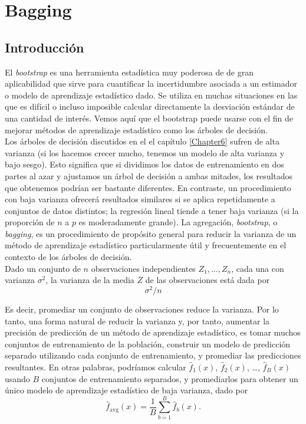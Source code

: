 \chapter{Bagging}\label{Chapter10} 

\section{Introducción}

El \textit{bootstrap} es una herramienta estadística muy poderosa de de gran aplicabilidad que sirve para cuantificar la incertidumbre asociada a un estimador o modelo de aprendizaje estadístico dado. Se utiliza en muchas situaciones en las que es difícil o incluso imposible calcular directamente la desviación estándar de una cantidad de interés. Vemos aquí que el bootstrap puede usarse con el fin de mejorar métodos de aprendizaje estadístico como los árboles de decisión. \\

Los árboles de decisión discutidos en el el capítulo \ref{Chapter6} sufren de alta varianza (si los hacemos crecer mucho, tenemos un modelo de alta varianza y bajo sesgo). Esto significa que si dividimos los datos de entrenamiento en dos partes al azar y ajustamos un árbol de decisión a ambas mitades, los resultados que obtenemos podrían ser bastante diferentes. En contraste, un procedimiento con baja varianza ofrecerá resultados similares si se aplica repetidamente a conjuntos de datos distintos; la regresión lineal tiende a tener baja varianza (si la proporción de $n$ a $p$ es moderadamente grande). La agregación, \textit{bootstrap}, o \textit{bagging}, es un procedimiento de propósito general para reducir la varianza de un método de aprendizaje estadístico particularmente útil y frecuentemente en el contexto de los árboles de decisión. \\

Dado un conjunto de $n$ observaciones independientes $Z_1, \ldots, Z_n$, cada una con varianza $\sigma^2$, la varianza de la media $\overline{Z}$ de las observaciones está dada por 
\begin{equation}
\sigma^2/n
\end{equation}

Es decir, promediar un conjunto de observaciones reduce la varianza. Por lo tanto, una forma natural de reducir la varianza y, por tanto, aumentar la precisión de predicción de un método de aprendizaje estadístico, es tomar muchos conjuntos de entrenamiento de la población, construir un modelo de predicción separado utilizando cada conjunto de entrenamiento, y promediar las predicciones resultantes. En otras palabras, podríamos calcular $\hat{f}_1(x)$, $\hat{f}_2(x)$, \ldots, $\hat{f}_B(x)$ usando $B$ conjuntos de entrenamiento separados, y promediarlos para obtener un único modelo de aprendizaje estadístico de baja varianza, dado por
\begin{equation}
\hat{f}_{\text{avg}}(x) = \frac{1}{B} \sum_{b=1}^{B} \hat{f}_b(x).
\end{equation}

